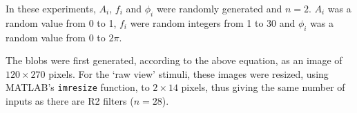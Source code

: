 \documentclass[10pt]{article}
\newcommand{\Matlab}{MATLAB}
\begin{document}
In these experiments, $A_i$, $f_i$ and $\phi_i$ were randomly generated and $n=2$.
$A_i$ was a random value from 0 to 1, $f_i$ were random integers from 1 to 30 and $\phi_i$ was a random value from 0 to $2\pi$.
\begin{comment}
nvar = 1000;
nwave = 2;
maxfreq = 30;
maxamp = 1;
\end{comment}

The blobs were first generated, according to the above equation, as an image of $120\times 270$ pixels.
For the `raw view' stimuli, these images were resized, using \Matlab's \texttt{imresize} function, to $2\times 14$ pixels, thus giving the same number of inputs as there are R2 filters ($n=28$).

\begin{comment}
\subsubsection*{Grading performance of neural networks}
The performance of neural networks was graded by calculating the \ac{rms} difference between the matrix of true values for the parameters with the network's output:
$$
E(\mathbf{y},\mathbf{t}) = \sqrt{\frac{\sum\limits_{i=1}^{n} (\mathbf{y}_i-\mathbf{t}_i)^2}{n}}
$$
where $E(\mathbf{y},\mathbf{t})$ is the mean error score, computed from the vector of outputs given by the network, $\mathbf{y}$, and the vector of true values, $\mathbf{t}$.
Hence, for a network that computed the values of all parameters accurately, a graph of the network's output \emph{vs.} the true values would give the line $y=x$ and an error score of 0 over the whole range of values.
\end{comment}


\end{document}

